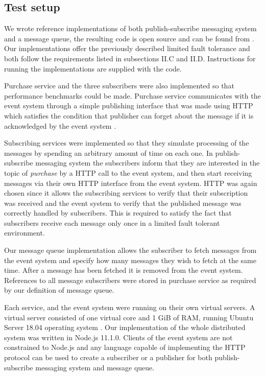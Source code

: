 \documentclass[conference]{IEEEtran}
\begin{document}
\subsection{Test setup}
We wrote reference implementations of both publish-subscribe messaging system and a message queue, the resulting code is open source and can be found from \cite{mycode}. Our implementations offer the previously described limited fault tolerance and both follow the requirements listed in subsections II.C and II.D. Instructions for running the implementations are supplied with the code.

Purchase service and the three subscribers were also implemented so that performance benchmarks could be made. Purchase service communicates with the event system through a simple publishing interface that was made using HTTP which satisfies the condition that publisher can forget about the message if it is acknowledged by the event system \cite{httprfc}.

Subscribing services were implemented so that they simulate processing of the messages by spending an arbitrary amount of time on each one. In publish-subscribe messaging system the subscribers inform that they are interested in the topic of \textit{purchase} by a HTTP call to the event system, and then start receiving messages via their own HTTP interface from the event system. HTTP was again chosen since it allows the subscribing services to verify that their subscription was received and the event system to verify that the published message was correctly handled by subscribers. This is required to satisfy the fact that subscribers receive each message only once in a limited fault tolerant environment.

Our message queue implementation allows the subscriber to fetch messages from the event system and specify how many messages they wish to fetch at the same time. After a message has been fetched it is removed from the event system. References to all message subscribers were stored in purchase service as required by our definition of message queue.

Each service, and the event system were running on their own virtual servers. A virtual server consisted of one virtual core and 1 GiB of RAM, running Ubuntu Server 18.04 operating system \cite{aws}. Our implementation of the whole distributed system was written in Node.js 11.1.0. Clients of the event system are not constrained to Node.js and any language capable of implementing the HTTP protocol can be used to create a subscriber or a publisher for both publish-subscribe messaging system and message queue.
\end{document}
